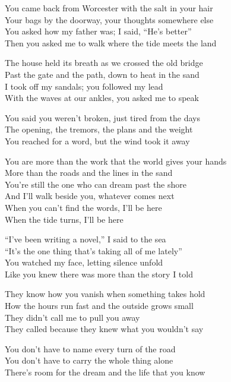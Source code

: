 \begin{lyrics}
You came back from Worcester with the salt in your hair\\
Your bags by the doorway, your thoughts somewhere else\\
You asked how my father was; I said, “He’s better”\\
Then you asked me to walk where the tide meets the land

The house held its breath as we crossed the old bridge\\
Past the gate and the path, down to heat in the sand\\
I took off my sandals; you followed my lead\\
With the waves at our ankles, you asked me to speak

You said you weren’t broken, just tired from the days\\
The opening, the tremors, the plans and the weight\\
You reached for a word, but the wind took it away

You are more than the work that the world gives your hands\\
More than the roads and the lines in the sand\\
You’re still the one who can dream past the shore\\
And I’ll walk beside you, whatever comes next\\
When you can’t find the words, I’ll be here\\
When the tide turns, I’ll be here

“I’ve been writing a novel,” I said to the sea\\
“It’s the one thing that’s taking all of me lately”\\
You watched my face, letting silence unfold\\
Like you knew there was more than the story I told

They know how you vanish when something takes hold\\
How the hours run fast and the outside grows small\\
They didn’t call me to pull you away\\
They called because they knew what you wouldn’t say

You don’t have to name every turn of the road\\
You don’t have to carry the whole thing alone\\
There’s room for the dream and the life that you know


\end{lyrics}
